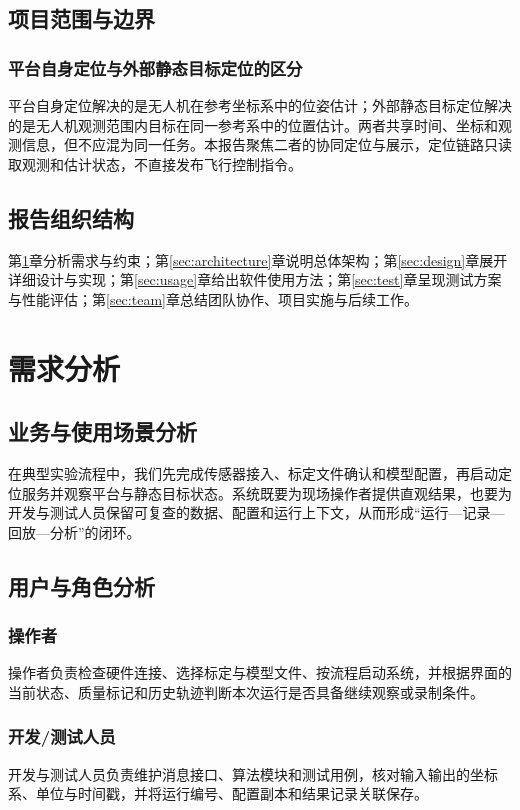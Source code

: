 \documentclass[UTF8,a4paper,12pt]{ctexart}
\begin{document}
\subsection{项目范围与边界}
\subsubsection{平台自身定位与外部静态目标定位的区分}
平台自身定位解决的是无人机在参考坐标系中的位姿估计；外部静态目标定位解决的是无人机观测范围内目标在同一参考系中的位置估计。两者共享时间、坐标和观测信息，但不应混为同一任务。本报告聚焦二者的协同定位与展示，定位链路只读取观测和估计状态，不直接发布飞行控制指令。

\subsection{报告组织结构}
第\ref{sec:requirement}章分析需求与约束；第\ref{sec:architecture}章说明总体架构；第\ref{sec:design}章展开详细设计与实现；第\ref{sec:usage}章给出软件使用方法；第\ref{sec:test}章呈现测试方案与性能评估；第\ref{sec:team}章总结团队协作、项目实施与后续工作。

\section{需求分析}\label{sec:requirement}
\subsection{业务与使用场景分析}
在典型实验流程中，我们先完成传感器接入、标定文件确认和模型配置，再启动定位服务并观察平台与静态目标状态。系统既要为现场操作者提供直观结果，也要为开发与测试人员保留可复查的数据、配置和运行上下文，从而形成“运行—记录—回放—分析”的闭环。

\subsection{用户与角色分析}
\subsubsection{操作者}
操作者负责检查硬件连接、选择标定与模型文件、按流程启动系统，并根据界面的当前状态、质量标记和历史轨迹判断本次运行是否具备继续观察或录制条件。

\subsubsection{开发/测试人员}
开发与测试人员负责维护消息接口、算法模块和测试用例，核对输入输出的坐标系、单位与时间戳，并将运行编号、配置副本和结果记录关联保存。
\end{document}
